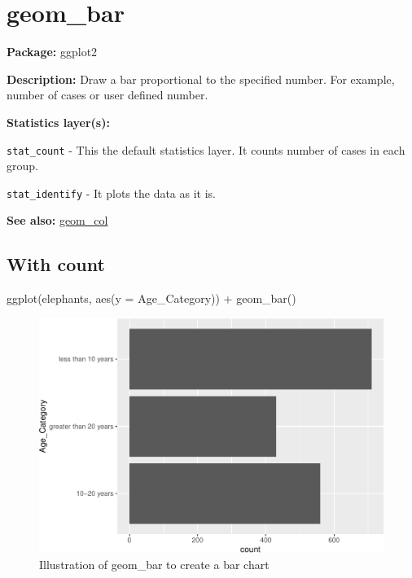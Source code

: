 \documentclass[
]{book}
\newenvironment{Shaded}{\begin{snugshade}}{\end{snugshade}}
\newcommand{\AttributeTok}[1]{\textcolor[rgb]{0.77,0.63,0.00}{#1}}
\newcommand{\FunctionTok}[1]{\textcolor[rgb]{0.00,0.00,0.00}{#1}}
\newcommand{\NormalTok}[1]{#1}
\newcommand{\SpecialCharTok}[1]{\textcolor[rgb]{0.00,0.00,0.00}{#1}}
\begin{document}
\hypertarget{geom_bar}{%
\section{geom\_bar}\label{geom_bar}}

\textbf{Package: } ggplot2 \autocite{R-ggplot2}

\textbf{Description: } Draw a bar proportional to the specified number. For example, number of cases or user defined number.

\textbf{Statistics layer(s): }

\texttt{stat\_count} - This the default statistics layer. It counts number of cases in each group.

\texttt{stat\_identify} - It plots the data as it is.

\textbf{See also: } \protect\hyperlink{col}{geom\_col}

\hypertarget{with-count}{%
\subsection{With count}\label{with-count}}

\begin{Shaded}
\begin{Highlighting}[]
\FunctionTok{ggplot}\NormalTok{(elephants, }\FunctionTok{aes}\NormalTok{(}\AttributeTok{y =}\NormalTok{ Age\_Category)) }\SpecialCharTok{+} 
  \FunctionTok{geom\_bar}\NormalTok{()}
\end{Highlighting}
\end{Shaded}

\begin{figure}
\centering
\includegraphics{Data-Visualisation-geom-Encyclopedia_files/figure-latex/unnamed-chunk-18-1.pdf}
\caption{\label{fig:unnamed-chunk-18}Illustration of geom\_bar to create a bar chart}
\end{figure}
\end{document}
